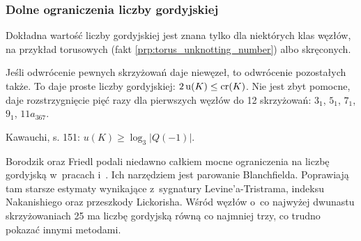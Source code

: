 
\subsubsection{Dolne ograniczenia liczby gordyjskiej}
Dokładna wartość liczby gordyjskiej jest znana tylko dla niektórych klas węzłów, na przykład torusowych (fakt \ref{prp:torus_unknotting_number}) albo skręconych.

Jeśli odwrócenie pewnych skrzyżowań daje niewęzeł, to odwrócenie pozostałych także.
To daje proste liczby gordyjskiej: $2 \operatorname{u} (K) \le \operatorname{cr} (K)$.
Nie jest zbyt pomocne, daje rozstrzygnięcie pięć razy dla pierwszych węzłów do 12 skrzyżowań: $3_{1}$, $5_{1}$, $7_{1}$, $9_{1}$, $11a_{367}$.

\begin{tobedone}
    Kawauchi, s. 151: $u(K) \ge \log_3|Q(-1)|$.
\end{tobedone}

Borodzik oraz Friedl podali niedawno całkiem mocne ograniczenia na liczbę gordyjską w~pracach \cite{borodzik14} i~\cite{borodzik15}.
Ich narzędziem jest parowanie Blanchfielda.
Poprawiają tam starsze estymaty wynikające z~sygnatury Levine'a-Tristrama, indeksu Nakanishiego oraz przeszkody Lickorisha.
%
%
%
%
Wśród węzłów o~co najwyżej dwunastu skrzyżowaniach 25 ma liczbę gordyjską równą co najmniej trzy, co trudno pokazać innymi metodami.
